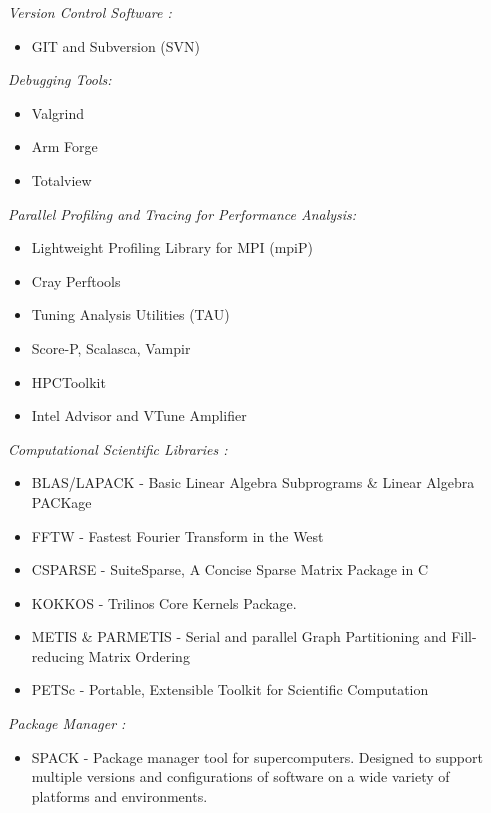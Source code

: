 \documentclass[margin]{res}
\begin{document}
\begin{resume}
{\sl Version Control Software :} %
  \begin{itemize}  \itemsep -1pt 
      \item GIT and Subversion (SVN) 
    \end{itemize}    

{\sl Debugging Tools:}
  \begin{itemize}  \itemsep -1pt  
      \item Valgrind
      \item Arm Forge
      \item Totalview  
    \end{itemize}
    
{\sl Parallel Profiling and Tracing for Performance Analysis:}
  \begin{itemize}  \itemsep -1pt  
      \item Lightweight Profiling Library for MPI (mpiP)
      \item Cray Perftools
      \item Tuning Analysis Utilities (TAU)
      \item Score-P, Scalasca, Vampir
      \item HPCToolkit
      \item Intel Advisor and VTune Amplifier
    \end{itemize}
    
{\sl Computational Scientific  Libraries :}
  \begin{itemize}  \itemsep -1pt  
      \item BLAS/LAPACK - Basic Linear Algebra Subprograms \& Linear Algebra PACKage 
      \item FFTW - Fastest Fourier Transform in the West
      \item CSPARSE - SuiteSparse, A Concise Sparse Matrix Package in C
      \item KOKKOS - Trilinos Core Kernels Package.
      \item METIS \& PARMETIS - Serial and parallel Graph Partitioning and Fill-reducing Matrix Ordering
      \item PETSc - Portable, Extensible Toolkit for Scientific Computation
    \end{itemize}
    
{\sl Package Manager :}
  \begin{itemize}  \itemsep -1pt  
      \item SPACK - Package manager tool for supercomputers. Designed to support multiple versions and configurations of software on a wide variety of platforms and environments.
    \end{itemize}    
    

\end{resume}
\end{document}
